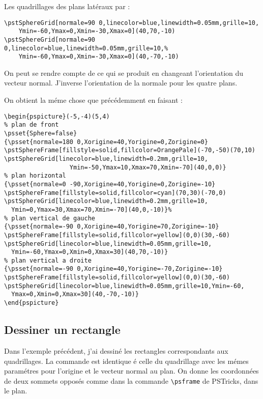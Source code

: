 \documentclass[11pt,frenchb,BCOR10mm,DIV12,bibliography=totoc,parskip=false,smallheadings
    headexclude,footexclude,oneside]{pst-doc}
\begin{document}
Les quadrillages des plans latéraux par :

\begin{lstlisting}
\pstSphereGrid[normale=90 0,linecolor=blue,linewidth=0.05mm,grille=10,
    Ymin=-60,Ymax=0,Xmin=-30,Xmax=0](40,70,-10)
\pstSphereGrid[normale=90 0,linecolor=blue,linewidth=0.05mm,grille=10,%
    Ymin=-60,Ymax=0,Xmin=-30,Xmax=0](40,-70,-10)
\end{lstlisting}

On peut se rendre compte de ce qui se produit en changeant l'orientation
du vecteur normal. J'inverse l'orientation de la normale pour les quatre plans.

On obtient la méme chose que précédemment en faisant :

\begin{lstlisting}
\begin{pspicture}(-5,-4)(5,4)
% plan de front
\psset{Sphere=false}
{\psset{normale=180 0,Xorigine=40,Yorigine=0,Zorigine=0}
\pstSphereFrame[fillstyle=solid,fillcolor=OrangePale](-70,-50)(70,10)
\pstSphereGrid[linecolor=blue,linewidth=0.2mm,grille=10,
                  Ymin=-50,Ymax=10,Xmax=70,Xmin=-70](40,0,0)}
% plan horizontal
{\psset{normale=0 -90,Xorigine=40,Yorigine=0,Zorigine=-10}
\pstSphereFrame[fillstyle=solid,fillcolor=cyan](70,30)(-70,0)
\pstSphereGrid[linecolor=blue,linewidth=0.2mm,grille=10,
  Ymin=0,Ymax=30,Xmax=70,Xmin=-70](40,0,-10)}%
% plan vertical de gauche
{\psset{normale=-90 0,Xorigine=40,Yorigine=70,Zorigine=-10}
\pstSphereFrame[fillstyle=solid,fillcolor=yellow](0,0)(30,-60)
\pstSphereGrid[linecolor=blue,linewidth=0.05mm,grille=10,
  Ymin=-60,Ymax=0,Xmin=0,Xmax=30](40,70,-10)}
% plan vertical a droite
{\psset{normale=-90 0,Xorigine=40,Yorigine=-70,Zorigine=-10}
\pstSphereFrame[fillstyle=solid,fillcolor=yellow](0,0)(30,-60)
\pstSphereGrid[linecolor=blue,linewidth=0.05mm,grille=10,Ymin=-60,
  Ymax=0,Xmin=0,Xmax=30](40,-70,-10)}
\end{pspicture}
\end{lstlisting}


\subsection{Dessiner un rectangle}
Dans l'exemple précédent, j'ai dessiné les rectangles
correspondants aux quadrillages. La commande est identique é celle
du quadrillage avec les mémes paramétres pour l'origine et le
vecteur normal au plan. On donne les coordonnées de deux sommets
opposés comme dans la commande \verb+\psframe+ de PSTricks, dans le
plan.
\end{document}
